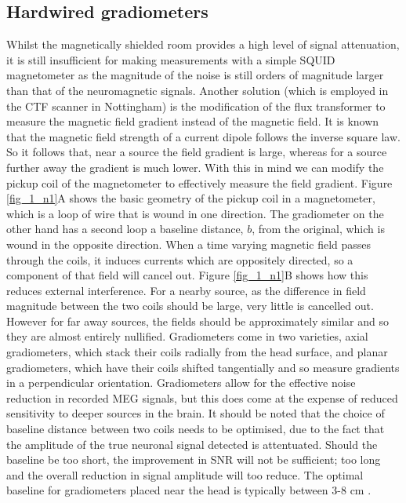 \subsection{Hardwired gradiometers}
Whilst the magnetically shielded room provides a high level of signal attenuation, it is still insufficient for making measurements with a simple SQUID magnetometer as the magnitude of the noise is still orders of magnitude larger than that of the neuromagnetic signals. Another solution (which is employed in the CTF scanner in Nottingham) is the modification of the flux transformer to measure the magnetic field gradient instead of the magnetic field. It is known that the magnetic field strength of a current dipole follows the inverse square law. So it follows that, near a source the field gradient is large, whereas for a source further away the gradient is much lower. With this in mind we can modify the pickup coil of the magnetometer to effectively measure the field gradient. Figure \ref{fig_1_n1}A shows the basic geometry of the pickup coil in a magnetometer, which is a loop of wire that is wound in one direction. The gradiometer on the other hand has a second loop a baseline distance, $b$, from the original, which is wound in the opposite direction. When a time varying magnetic field passes through the coils, it induces currents which are oppositely directed, so a component of that field will cancel out. Figure \ref{fig_1_n1}B shows how this reduces external interference. For a nearby source, as the difference in field magnitude between the two coils should be large, very little is cancelled out. However for far away sources, the fields should be approximately similar and so they are almost entirely nullified. Gradiometers come in two varieties, axial gradiometers, which stack their coils radially from the head surface, and planar gradiometers, which have their coils shifted tangentially and so measure gradients in a perpendicular orientation. Gradiometers allow for the effective noise reduction in recorded MEG signals, but this does come at the expense of reduced sensitivity to deeper sources in the brain. It should be noted that the choice of baseline distance between two coils needs to be optimised, due to the fact that the amplitude of the true neuronal signal detected is attentuated. Should the baseline be too short, the improvement in SNR will not be sufficient; too long and the overall reduction in signal amplitude will too reduce. The optimal baseline for gradiometers placed near the head is typically between 3-8 cm \cite{Vrba2001}. 

